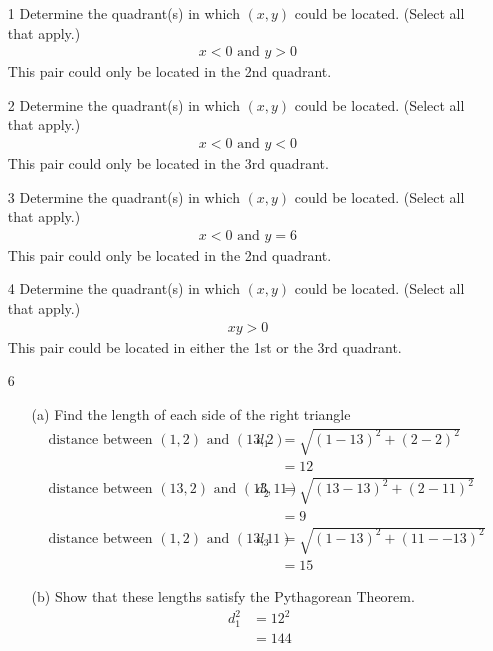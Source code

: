 \documentclass{article}
\begin{document}
			\begin{enumerate}[widest={1}]
				\item[1] Determine the quadrant(s) in which $(x, y)$ could be located. (Select all that apply.)
				\begin{align*}
					x < 0 \text{ and } y > 0
				\end{align*}
				This pair could only be located in the 2nd quadrant.
				\item[2] Determine the quadrant(s) in which $(x, y)$ could be located. (Select all that apply.)
				\begin{align*}
					x < 0 \text{ and } y < 0
				\end{align*}
				This pair could only be located in the 3rd quadrant.
				\item[3] Determine the quadrant(s) in which $(x, y)$ could be located. (Select all that apply.)
				\begin{align*}
					x < 0 \text{ and } y = 6
				\end{align*}
				This pair could only be located in the 2nd quadrant.
				\item[4] Determine the quadrant(s) in which $(x, y)$ could be located. (Select all that apply.)
				\begin{align*}
					xy > 0
				\end{align*}
				This pair could be located in either the 1st or the 3rd quadrant.
				\item[6]
				\begin{enumerate}
					\item[(a)] Find the length of each side of the right triangle \\
					\begin{align*}
						& \text{distance between }(1, 2)\text{ and }(13, 2)&d_1 &= \sqrt{(1-13)^2+(2-2)^2} \\
						&&&= 12 \\
						& \text{distance between }(13, 2)\text{ and }(13, 11)&d_2 &= \sqrt{(13-13)^2+(2-11)^2} \\
						&&&= 9 \\
						& \text{distance between }(1, 2)\text{ and }(13, 11)&d_3 &= \sqrt{(1-13)^2+(11--13)^2} \\
						&&&= 15
					\end{align*}
					\item[(b)] Show that these lengths satisfy the Pythagorean Theorem.
					\begin{align*}
						d_1^2 &= 12^2 \\
						&= 144 \\

\end{align*}
\end{enumerate}
\end{enumerate}
\end{document}
